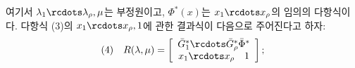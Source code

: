 
여기서 $\lambda_1\rcdots\lambda_\rho,\mu$는 부정원이고, $\Phi^*(x)$는 $x_1\rcdots x_\rho$의 임의의 다항식이다. 다항식 (3)의 $x_1\rcdots x_\rho,1$에 관한 결과식이 다음으로 주어진다고 하자:
\[
\begin{array}{@{}l@{\quad}c@{}}
(4)& \displaystyle R(\lambda,\mu)=\left[\begin{array}{cc} \bar G_1^*\rcdots \bar G_\rho^*\bar\Phi^*\\ x_1\rcdots x_\rho\quad 1\end{array}\right];
\end{array}
\]
